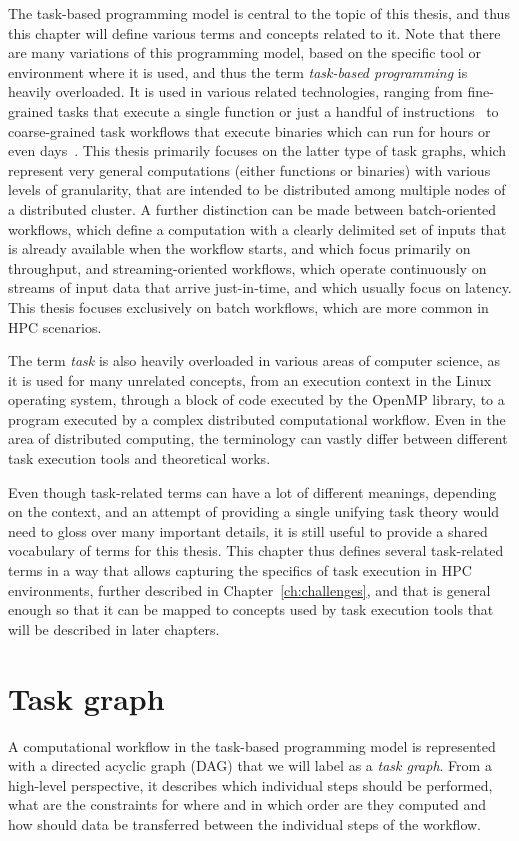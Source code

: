 The task-based programming model is central to the topic of this thesis, and thus this chapter will
define various terms and concepts related to it. Note that there are many variations of this
programming model, based on the specific tool or environment where it is used, and thus the term
\emph{task-based programming} is heavily overloaded. It is used in various related technologies, ranging
from fine-grained tasks that execute a single function or just a handful of
instructions~\cite{starpu,openmp} to coarse-grained task workflows that execute binaries which
can run for hours or even days~\cite{dask, snakemake, nextflow}. This thesis primarily focuses on the latter
type of task graphs, which represent very general computations (either functions or binaries) with
various levels of granularity, that are intended to be distributed among multiple nodes of a
distributed cluster. A further distinction can be made between batch-oriented workflows, which
define a computation with a clearly delimited set of inputs that is already available when the
workflow starts, and which focus primarily on throughput, and streaming-oriented workflows, which
operate continuously on streams of input data that arrive just-in-time, and which usually focus on
latency. This thesis focuses exclusively on batch workflows, which are more common in HPC
scenarios.

The term \emph{task} is also heavily overloaded in various areas of computer science, as
it is used for many unrelated concepts, from an execution context in the Linux operating system,
through a block of code executed by the OpenMP library, to a program executed by a complex
distributed computational workflow. Even in the area of distributed computing, the terminology can
vastly differ between different task execution tools and theoretical works.

Even though task-related terms can have a lot of different meanings, depending on the context, and
an attempt of providing a single unifying task theory would need to gloss over many important
details, it is still useful to provide a shared vocabulary of terms for this thesis. This chapter
thus defines several task-related terms in a way that allows capturing the specifics of task
execution in HPC environments, further described in Chapter~\ref{ch:challenges}, and that is
general enough so that it can be mapped to concepts used by task execution tools that will be
described in later chapters.

\section{Task graph}
A computational workflow in the task-based programming model is represented with a directed acyclic
graph (DAG) that we will label as a \emph{task graph}. From a high-level perspective, it
describes which individual steps should be performed, what are the constraints for where and in
which order are they computed and how should data be transferred between the individual steps of
the workflow.


